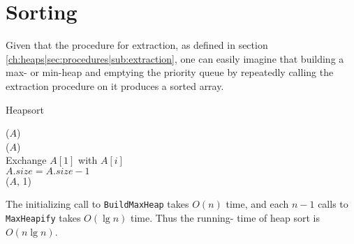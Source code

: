 \newpage
\section{Sorting}
Given that the procedure for extraction, as defined in section
\ref{ch:heaps|sec:procedures|sub:extraction}, one can easily imagine that
building a max- or min-heap and emptying the priority queue by repeatedly
calling the extraction procedure on it produces a sorted array.

\begin{algorithm}[H]
	\caption{Heapsort}
	\label{alg:heapsort}
	
	
	
	
	
	\BlankLine
	\HeapSort($A$) \\
	\Begin
	{
		\BuildMaxHeap($A$) \\
		{
			Exchange $A[1]$ with $A[i]$ \\
			$A.size = A.size - 1$ \\
			\MaxHeapify($A$, 1)
		}
	}
\end{algorithm}

The initializing call to \texttt{BuildMaxHeap} takes $O(n)$ time, and each
$n-1$ calls to \texttt{MaxHeapify} takes $O(\lg n)$ time. Thus the running-
time of heap sort is $O(n \lg n)$.

